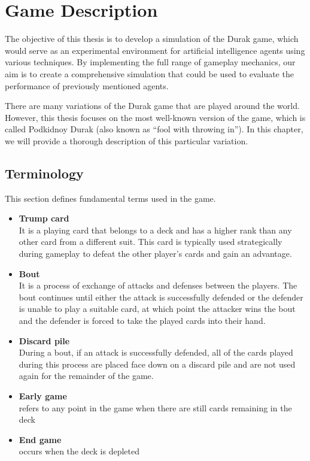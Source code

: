\chapter{Game Description}
\label{GameDescription}
The objective of this thesis is to develop a simulation of the Durak game, which would serve as an experimental environment for artificial intelligence agents using various techniques. By implementing the full range of gameplay mechanics, our aim is to create a comprehensive simulation that could be used to evaluate the performance of previously mentioned agents.

There are many variations of the Durak game that are played around the world. However, this thesis focuses on the most well-known version of the game, which is called Podkidnoy Durak (also known as ``fool with throwing in'')\citep*{website:PAGAT_PODKIDNOY_DURAK}. In this chapter, we will provide a thorough description of this particular variation.

\section{Terminology}
\label{terminology}
This section defines fundamental terms used in the game.
\begin{itemize}


        \item \textbf{Trump card} \\
        It is a playing card that belongs to a deck and has a higher rank than any other card from a different suit. This card is typically used strategically during gameplay to defeat the other player's cards and gain an advantage.
        \item \textbf{Bout} \\
         It is a process of exchange of attacks and defenses between the players. The bout continues until either the attack is successfully defended or the defender is unable to play a suitable card, at which point the attacker wins the bout and the defender is forced to take the played cards into their hand.
        \item \textbf{Discard pile} \\
         During a bout, if an attack is successfully defended, all of the cards played during this process are placed face down on a discard pile and are not used again for the remainder of the game.
		
		\item \textbf{Early game} \\
		refers to any point in the game when there are still cards remaining in the deck
		
		\item \textbf{End game} \\
		occurs when the deck is depleted
\end{itemize}

